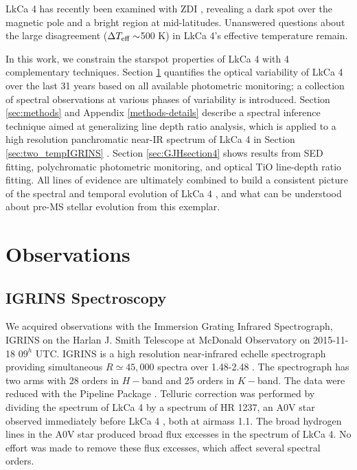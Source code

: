 \documentclass[twocolumn]{emulateapj}%
\newcommand{\name}{LkCa 4 }
\begin{document}
LkCa 4 has recently been examined with ZDI \citep{donati14}, revealing a dark spot over the magnetic pole and a bright region at mid-latitudes.  Unanswered questions about the large disagreement ($\Delta T_\textrm{eff} \sim$500 K) in LkCa 4's effective temperature \citep{herczeg14, donati14} remain.

In this work, we constrain the starspot properties of \name with 4 complementary techniques.  Section \ref{sec:obs} quantifies the optical variability of \name over the last 31 years based on all available photometric monitoring; a collection of spectral observations at various phases of variability is introduced.  Section \ref{sec:methods} and Appendix \ref{methods-details} describe a spectral inference technique aimed at generalizing line depth ratio analysis, which is applied to a high resolution panchromatic near-IR spectrum of \name in Section \ref{sec:two_tempIGRINS} .  Section \ref{sec:GJHsection4} shows results from SED fitting, polychromatic photometric monitoring, and optical TiO line-depth ratio fitting.  All lines of evidence are ultimately combined to build a consistent picture of the spectral and temporal evolution of \name, and what can be understood about pre-MS stellar evolution from this exemplar.


\section{Observations}\label{sec:obs} 

\subsection{IGRINS Spectroscopy}\label{sec:igrins} 
We acquired observations with the Immersion Grating Infrared Spectrograph, IGRINS \citep{park14} on the Harlan J. Smith Telescope at McDonald Observatory on 2015-11-18 $09^h$ UTC.  IGRINS is a high resolution near-infrared echelle spectrograph providing simultaneous $R\simeq45,000$ spectra over 1.48-2.48 \um.  The spectrograph has two arms with 28 orders in $H-$band and 25 orders in $K-$band.  The data were reduced with the Pipeline Package \citep{jaejoonlee15}.  Telluric correction was performed by dividing the spectrum of \name by a spectrum of HR 1237, an A0V star observed immediately before \name, both at airmass 1.1.  The broad hydrogen lines in the A0V star produced broad flux excesses in the spectrum of LkCa 4.  No effort was made to remove these flux excesses, which affect several spectral orders. 
\end{document}
